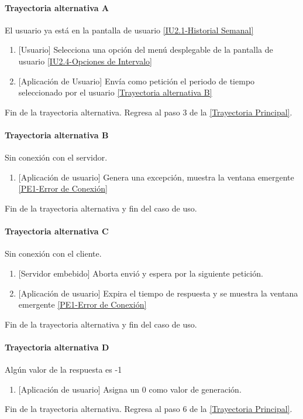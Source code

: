 \paragraph{Trayectoria alternativa A} \label{SUB-U-CU1.3:TA}
    El usuario ya está en la pantalla de usuario \hyperref[fig:Historial Semanal]{[IU2.1-Historial Semanal]}
	\begin{enumerate}[label=A\arabic*.]
	    \item {[Usuario]} Selecciona una opción del menú desplegable de la pantalla de usuario \hyperref[fig:Opciones de Intervalo]{[IU2.4-Opciones de Intervalo]}
	    \item {[Aplicación de Usuario]} Envía como petición el periodo de tiempo seleccionado por el usuario \hyperref[SUB-U-CU1.3:TB]{[Trayectoria alternativa B]} 
	\end{enumerate}
	Fin de la trayectoria alternativa. Regresa al paso 3 de la \hyperref[SUB-U-CU1.3:TP]{[Trayectoria Principal]}.
	
\paragraph{Trayectoria alternativa B} \label{SUB-U-CU1.3:TB}
	Sin conexión con el servidor.
	\begin{enumerate}[label=B\arabic*.]
		\item {[Aplicación de usuario]} Genera una excepción, muestra la ventana emergente \hyperref[fig:Error de Conexion]{[PE1-Error de Conexión]}
	\end{enumerate}
	Fin de la trayectoria alternativa y fin del caso de uso.

\paragraph{Trayectoria alternativa C} \label{SUB-U-CU1.3:TC}
	Sin conexión con el cliente.
	\begin{enumerate}[label=C\arabic*.]
		\item {[Servidor embebido]} Aborta envió y espera por la siguiente petición.
		\item {[Aplicación de usuario]} Expira el tiempo de respuesta y se muestra la ventana emergente \hyperref[fig:Error de Conexion]{[PE1-Error de Conexión]}
	\end{enumerate}
	Fin de la trayectoria alternativa y fin del caso de uso.
	
\paragraph{Trayectoria alternativa D} \label{SUB-U-CU1.3:TD}
	Algún valor de la respuesta es -1
	\begin{enumerate}[label=D\arabic*.]
		\item {[Aplicación de usuario]} Asigna un 0 como valor de generación.
	\end{enumerate}
	Fin de la trayectoria alternativa. Regresa al paso 6 de la \hyperref[SUB-U-CU1.3:TP]{[Trayectoria Principal]}.
